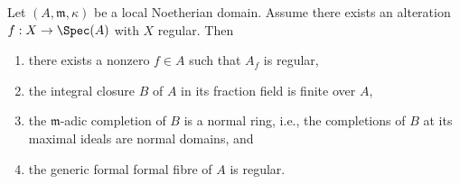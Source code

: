 \begin{lemma}
\label{lemma-regular-alteration-implies-local}
Let $(A, \mathfrak m, \kappa)$ be a local Noetherian domain.
Assume there exists an alteration $f : X \to \Spec(A)$
with $X$ regular. Then
\begin{enumerate}
\item there exists a nonzero $f \in A$ such that $A_f$ is regular,
\item the integral closure $B$ of $A$ in its fraction field is finite over $A$,
\item the $\mathfrak m$-adic completion of $B$ is a normal ring, i.e., the
completions of $B$ at its maximal ideals are normal domains, and
\item the generic formal formal fibre of $A$ is regular.
\end{enumerate}
\end{lemma}

